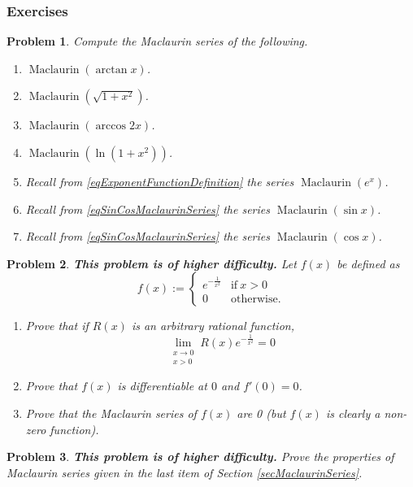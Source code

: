 \documentclass[12pt]{book}
\newtheorem{problem}{Problem}[section]
\DeclareMathOperator{\maclaurin}{Maclaurin}
\newcommand{\doublebrace}[4]{\left\{\begin{array}{ll} #1 & #2 \\#3 & #4  \end{array} \right.}
\begin{document}
\subsubsection{Exercises}
\begin{problem}
Compute the Maclaurin series of the following.
\begin{multicols}{2}
\begin{enumerate}
\item $\displaystyle \maclaurin (\arctan x) $.
\item $\displaystyle \maclaurin (\sqrt{1+x^2})$.
\item $\displaystyle \maclaurin (\arccos 2x)$.
\item $\displaystyle \maclaurin(\ln (1+x^2))$.
\item Recall from \eqref{eqExponentFunctionDefinition} the series $\displaystyle \maclaurin (e^x)$.
\item Recall from \eqref{eqSinCosMaclaurinSeries} the series $\displaystyle \maclaurin (\sin x)$.
\item Recall from \eqref{eqSinCosMaclaurinSeries} the series $\displaystyle \maclaurin (\cos x)$.
\end{enumerate}

\end{multicols}
\end{problem}

\begin{problem}\label{probDifferentiableNonAnalyticFunctionExample}
 \textbf{This problem is of higher difficulty.}
Let $f(x)$ be defined as 
\[
f(x):=\doublebrace{e^{-\frac{1}{x^2}}}{\mathrm{if~} x>0}{0}{\mathrm{otherwise.}}
\]
\begin{enumerate}
\item Prove that if $R(x)$ is an arbitrary rational function, 
\[
\lim\limits_{\substack{x\to 0\\ x>0}} R(x)e^{-\frac{1}{x^2}}=0
\]
\item Prove that $f(x)$ is differentiable at $0$ and $f'(0)=0$.
\item Prove that the Maclaurin series of $f(x)$ are 0 (but $f(x)$ is clearly a non-zero function).
\end{enumerate}

\end{problem}
\begin{problem}\textbf{This problem is of higher difficulty.} Prove the properties of Maclaurin series given in the last item of Section \ref{secMaclaurinSeries}.
\end{problem}
\end{document}
